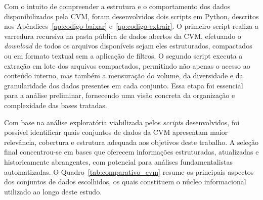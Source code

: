 Com o intuito de compreender a estrutura e o comportamento dos dados disponibilizados pela CVM, foram desenvolvidos dois scripts em Python, descritos nos Apêndices~\ref{ap:codigo-baixar} e~\ref{ap:codigo-extrair}. O primeiro script realiza a varredura recursiva na pasta pública de dados abertos da CVM, efetuando o \textit{download} de todos os arquivos disponíveis sejam eles estruturados, compactados ou em formato textual sem a aplicação de filtros. O segundo script executa a extração em lote dos arquivos compactados, permitindo não apenas o acesso ao conteúdo interno, mas também a mensuração do volume, da diversidade e da granularidade dos dados presentes em cada conjunto. Essa etapa foi essencial para a análise preliminar, fornecendo uma visão concreta da organização e complexidade das bases tratadas.

Com base na análise exploratória viabilizada pelos \textit{scripts} desenvolvidos, foi possível identificar quais conjuntos de dados da CVM apresentam maior relevância, cobertura e estrutura adequada aos objetivos deste trabalho. A seleção final concentrou-se em bases que oferecem informações estruturadas, atualizadas e historicamente abrangentes, com potencial para análises fundamentalistas automatizadas. O Quadro~\ref{tab:comparativo_cvm} resume os principais aspectos dos conjuntos de dados escolhidos, os quais constituem o núcleo informacional utilizado ao longo deste estudo.

